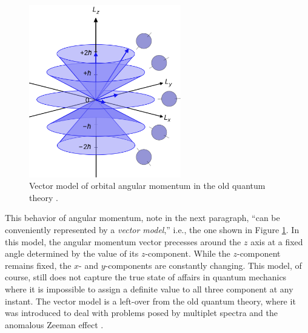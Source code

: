 \begin{figure}[ht]
 \centering
   \includegraphics[width=2.6in]{Vector_model_of_orbital_angular_momentum.png} 
   \caption{Vector model of orbital angular momentum in the old quantum theory \citep[Wikimedia Commons; cf.][p.\ 258, Fig.\ 7-12]{Eisberg and Resnick 1985}. }
   \label{Vector_model_of_orbital_angular_momentum}
\end{figure}

This behavior of angular momentum,  \citet[pp.\ 258--259]{Eisberg and Resnick 1985} note in the next paragraph, ``can be conveniently represented by a \emph{vector model},'' i.e., the one shown in Figure \ref{Vector_model_of_orbital_angular_momentum}. In this model, the angular momentum vector precesses around the $z$ axis at a fixed angle determined by the value of its $z$-component. While the $z$-component remains fixed, the $x$- and $y$-components are constantly changing. This model, of course, still does not capture the true state of affairs in quantum mechanics where it is impossible to assign a definite value to all three component at any instant. The vector model is a left-over from the old quantum theory, where it was introduced to deal with problems posed by multiplet spectra and the anomalous Zeeman effect \citep[Sec.\ 1.3.6 and Ch.\ 7]{Duncan and Janssen 2019}.

